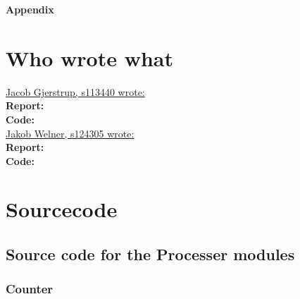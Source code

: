 \documentclass[12pt,a4paper]{article}
\begin{document}
\newpage	
	\begin{Large}
		\textbf{Appendix}
	\end{Large}
	\appendix

\section{Who wrote what}
\underline{Jacob Gjerstrup, s113440 wrote:}\\
\textbf{Report:}\\
\textbf{Code:}
\\
\underline{Jakob Welner, s124305 wrote:} \\
\textbf{Report:}\\
\textbf{Code:}

\section{Sourcecode}

\subsection{Source code for the Processer modules}
	\subsubsection{Counter}
%			
\end{document}
